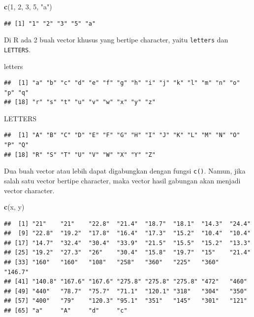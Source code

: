 \documentclass[]{book}
\newenvironment{Shaded}{\begin{snugshade}}{\end{snugshade}}
\newcommand{\DecValTok}[1]{\textcolor[rgb]{0.00,0.00,0.81}{#1}}
\newcommand{\KeywordTok}[1]{\textcolor[rgb]{0.13,0.29,0.53}{\textbf{#1}}}
\newcommand{\NormalTok}[1]{#1}
\newcommand{\StringTok}[1]{\textcolor[rgb]{0.31,0.60,0.02}{#1}}
\begin{document}
\begin{Shaded}
\begin{Highlighting}[]
\KeywordTok{c}\NormalTok{(}\DecValTok{1}\NormalTok{, }\DecValTok{2}\NormalTok{, }\DecValTok{3}\NormalTok{, }\DecValTok{5}\NormalTok{, }\StringTok{"a"}\NormalTok{)}
\end{Highlighting}
\end{Shaded}

\begin{verbatim}
## [1] "1" "2" "3" "5" "a"
\end{verbatim}

Di R ada 2 buah vector khusus yang bertipe character, yaitu \texttt{letters} dan \texttt{LETTERS}.

\begin{Shaded}
\begin{Highlighting}[]
\NormalTok{letters}
\end{Highlighting}
\end{Shaded}

\begin{verbatim}
##  [1] "a" "b" "c" "d" "e" "f" "g" "h" "i" "j" "k" "l" "m" "n" "o" "p" "q"
## [18] "r" "s" "t" "u" "v" "w" "x" "y" "z"
\end{verbatim}

\begin{Shaded}
\begin{Highlighting}[]
\NormalTok{LETTERS}
\end{Highlighting}
\end{Shaded}

\begin{verbatim}
##  [1] "A" "B" "C" "D" "E" "F" "G" "H" "I" "J" "K" "L" "M" "N" "O" "P" "Q"
## [18] "R" "S" "T" "U" "V" "W" "X" "Y" "Z"
\end{verbatim}

Dua buah vector atau lebih dapat digabungkan dengan fungsi \texttt{c()}. Namun, jika salah satu vector bertipe character, maka vector hasil gabungan akan menjadi vector character.

\begin{Shaded}
\begin{Highlighting}[]
\KeywordTok{c}\NormalTok{(x, y)}
\end{Highlighting}
\end{Shaded}

\begin{verbatim}
##  [1] "21"    "21"    "22.8"  "21.4"  "18.7"  "18.1"  "14.3"  "24.4" 
##  [9] "22.8"  "19.2"  "17.8"  "16.4"  "17.3"  "15.2"  "10.4"  "10.4" 
## [17] "14.7"  "32.4"  "30.4"  "33.9"  "21.5"  "15.5"  "15.2"  "13.3" 
## [25] "19.2"  "27.3"  "26"    "30.4"  "15.8"  "19.7"  "15"    "21.4" 
## [33] "160"   "160"   "108"   "258"   "360"   "225"   "360"   "146.7"
## [41] "140.8" "167.6" "167.6" "275.8" "275.8" "275.8" "472"   "460"  
## [49] "440"   "78.7"  "75.7"  "71.1"  "120.1" "318"   "304"   "350"  
## [57] "400"   "79"    "120.3" "95.1"  "351"   "145"   "301"   "121"  
## [65] "a"     "A"     "d"     "c"
\end{verbatim}
\end{document}
